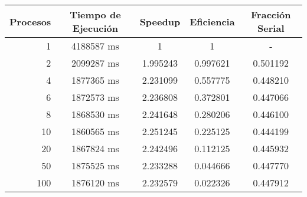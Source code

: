 \documentclass{article}
\begin{document}
\begin{center}
	\begin{tabular} {||r|c|c|c|c||}
		\hline \hline
		\bf{Procesos} & \bf{Tiempo de Ejecución} & \bf{Speedup} & \bf{Eficiencia} & \bf{Fracción Serial} \\ \hline
		1 & 4188587 ms & 1 & 1 & - \\ \hline
		2 & 2099287 ms & 1.995243 & 0.997621 & 0.501192 \\ \hline
		4 & 1877365 ms & 2.231099 & 0.557775 & 0.448210 \\ \hline
		6 & 1872573 ms & 2.236808 & 0.372801 & 0.447066 \\ \hline
		8 & 1868530 ms & 2.241648 & 0.280206 & 0.446100  \\ \hline
		10 & 1860565 ms & 2.251245 & 0.225125 & 0.444199 \\ \hline
		20 & 1867824 ms & 2.242496 & 0.112125 & 0.445932 \\ \hline
		50 & 1875525 ms & 2.233288 & 0.044666 & 0.447770 \\ \hline
		100 & 1876120 ms & 2.232579 & 0.022326 & 0.447912 \\ \hline
		\hline
	\end{tabular}
\end{center}
\end{document}
